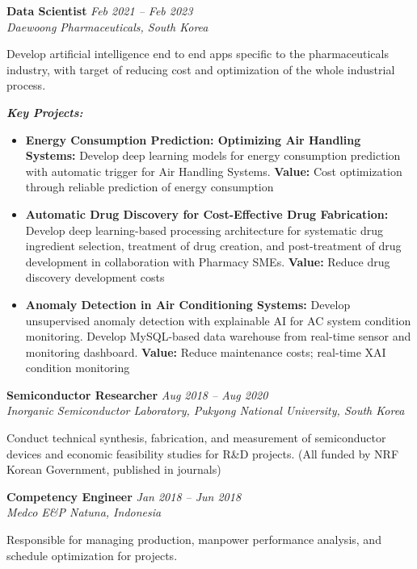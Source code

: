 \documentclass[10pt,a4paper]{article}
\newcommand{\experience}[4]{%
    \noindent\textbf{#1} \hfill \textit{#2}\\
    \textit{#3} \hfill #4\vspace{2pt}
}
\begin{document}
\vspace{4pt}

\experience{Data Scientist}{Feb 2021 -- Feb 2023}{Daewoong Pharmaceuticals, South Korea}{}

Develop artificial intelligence end to end apps specific to the pharmaceuticals industry, with target of reducing cost and optimization of the whole industrial process.

\textit{\textbf{Key Projects:}}
\begin{itemize}
    \item \textbf{Energy Consumption Prediction: Optimizing Air Handling Systems:} Develop deep learning models for energy consumption prediction with automatic trigger for Air Handling Systems. \textcolor{accent}{\textbf{Value:}} Cost optimization through reliable prediction of energy consumption
    \item \textbf{Automatic Drug Discovery for Cost-Effective Drug Fabrication:} Develop deep learning-based processing architecture for systematic drug ingredient selection, treatment of drug creation, and post-treatment of drug development in collaboration with Pharmacy SMEs. \textcolor{accent}{\textbf{Value:}} Reduce drug discovery development costs
    \item \textbf{Anomaly Detection in Air Conditioning Systems:} Develop unsupervised anomaly detection with explainable AI for AC system condition monitoring. Develop MySQL-based data warehouse from real-time sensor and monitoring dashboard. \textcolor{accent}{\textbf{Value:}} Reduce maintenance costs; real-time XAI condition monitoring
\end{itemize}

\vspace{4pt}

\experience{Semiconductor Researcher}{Aug 2018 -- Aug 2020}{Inorganic Semiconductor Laboratory, Pukyong National University, South Korea}{}

Conduct technical synthesis, fabrication, and measurement of semiconductor devices and economic feasibility studies for R\&D projects. (All funded by NRF Korean Government, published in journals)

\vspace{4pt}

\experience{Competency Engineer}{Jan 2018 -- Jun 2018}{Medco E\&P Natuna, Indonesia}{}

Responsible for managing production, manpower performance analysis, and schedule optimization for projects.
\end{document}
